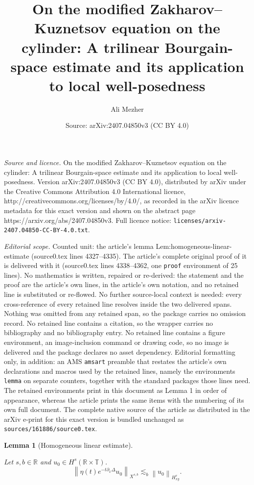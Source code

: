 \documentclass[10pt,a4paper]{amsart}
\title{On the modified Zakharov--Kuznetsov equation on the cylinder: A trilinear Bourgain-space estimate and its application to local well-posedness}
\author{Ali Mezher}
\date{Source: arXiv:2407.04850v3 (CC BY 4.0)}
\newtheorem{lemma}{Lemma}
\newcommand{\Hnxy}[3]{%
    \left\lVert #1\right\rVert_{H^{#2}_{#3}}%
}
\def\R{{\mathbb R}}
\def\T{{\mathbb T}}
\def\pt{\partial}
\newcommand{\xnorm}[3]{%
    \left\lVert #1\right\rVert_{X^{{#2},{#3}}}%
}
\begin{document}
\maketitle

\noindent\emph{Source and licence.} On the modified Zakharov--Kuznetsov equation on the cylinder: A trilinear Bourgain-space estimate and its application to local well-posedness. Version arXiv:2407.04850v3 (CC BY 4.0), distributed by arXiv under the Creative Commons Attribution 4.0 International licence, http://creativecommons.org/licenses/by/4.0/, as recorded in the arXiv licence metadata for this exact version and shown on the abstract page https://arxiv.org/abs/2407.04850v3. Full licence notice: \texttt{licenses/arxiv-2407.04850-CC-BY-4.0.txt}.\par\smallskip

\noindent\textit{Editorial scope.} Counted unit: the article's lemma Lem:homogeneous-linear-estimate (source0.tex lines 4327--4335). The article's complete original proof of it is delivered with it (source0.tex lines 4338--4362, one \texttt{proof} environment of 25 lines). No mathematics is written, repaired or re-derived: the statement and the proof are the article's own lines, in the article's own notation, and no retained line is substituted or re-flowed.  No further source-local context is needed: every cross-reference of every retained line resolves inside the two delivered spans.  Nothing was omitted from any retained span, so the package carries no omission record.  No retained line contains a citation, so the wrapper carries no bibliography and no bibliography entry.  No retained line contains a figure environment, an image-inclusion command or drawing code, so no image is delivered and the package declares no asset dependency.  Editorial formatting only, in addition: an AMS \texttt{amsart} preamble that restates the article's own declarations and macros used by the retained lines, namely the environments \texttt{lemma} on separate counters, together with the standard packages those lines need.  The retained environments print in this document as Lemma 1 in order of appearance, whereas the article prints the same items with the numbering of its own full document.  The complete native source of the article as distributed in the arXiv e-print for this exact version is bundled unchanged as \texttt{sources/161886/source0.tex}.
\begin{lemma}[Homogeneous linear estimate] 
\label{Lem:homogeneous-linear-estimate}

Let $s,b\in\R$ and $u_0\in H^s(\R\times\T)$.
\begin{equation}
\label{lem:homogeneous-linear-estimate}
\xnorm{{\eta(t) e^{-t\pt_x\Delta}u_0}}{s}{b} \lesssim_b \Hnxy{u_0}{s}{xy}.
\end{equation}
\end{lemma}
\end{document}
